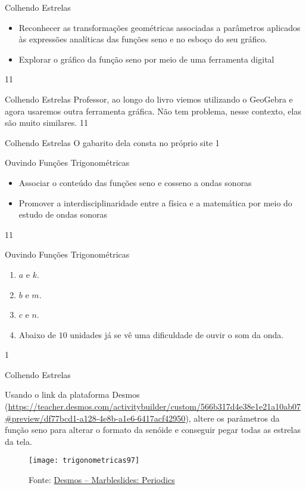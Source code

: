 \label{trig-prac4}
\begin{objectives}{Colhendo Estrelas}
{
\begin{itemize}
\item Reconhecer as transformações geométricas associadas a
parâmetros aplicados às expressões analíticas das funções
seno e no esboço do seu gráfico.
\item Explorar o gráfico da função seno por meio de uma
ferramenta digital
\end{itemize}
}{1}{1}
\end{objectives}
\begin{sugestions}{Colhendo Estrelas}
{
Professor, ao longo do livro viemos utilizando o GeoGebra e
agora usaremos outra ferramenta gráfica. Não tem problema,
nesse contexto, elas são muito similares.
}{1}{1}
\end{sugestions}
\begin{answer}{Colhendo Estrelas}
{
O gabarito dela consta no próprio site
}{1}
\end{answer}
\clearmargin
\begin{objectives}{Ouvindo Funções Trigonométricas}
{
\begin{itemize}
\item Associar o conteúdo das funções seno e cosseno a ondas sonoras
\item Promover a interdisciplinaridade entre a física e a matemática por meio do estudo de ondas sonoras
\end{itemize}
}{1}{1}
\end{objectives}
\begin{answer}{Ouvindo Funções Trigonométricas}
{
\begin{enumerate}
\item $a$ e $k$.
\item $b$ e $m$.
\item $c$ e $n$.
\item Abaixo de $10$ unidades já se vê uma dificuldade de ouvir o som da onda.
\end{enumerate}
}{1}
\end{answer}


\begin{task}{Colhendo Estrelas}
\label{trig-ativ19}

Usando o link da plataforma Desmos (\url{https://teacher.desmos.com/activitybuilder/custom/566b317d4e38e1e21a10ab07\#preview/df77bcd1-a128-4e8b-a1e6-6417acf42950}), altere os parâmetros da função seno para alterar o formato da senóide e conseguir pegar todas as estrelas da tela.

\begin{figure}[H]
\centering

\texttt{[image: trigonometricas97]}
\caption{Fonte: \href{https://teacher.desmos.com/activitybuilder/custom/566b317d4e38e1e21a10ab07\#preview/df77bcd1-a128-4e8b-a1e6-6417acf42950}{Desmos -- Marbleslides: Periodics}}
\label{}
\end{figure}

\end{task}

